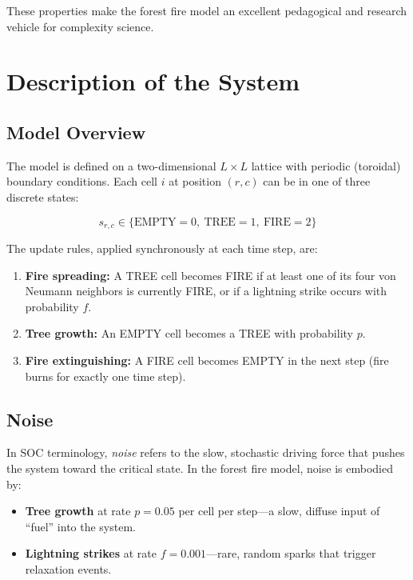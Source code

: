 \documentclass[12pt, a4paper]{article}
\begin{document}
These properties make the forest fire model an excellent pedagogical and research
vehicle for complexity science.

\section{Description of the System}
\label{sec:model}

\subsection{Model Overview}

The model is defined on a two-dimensional $L \times L$ lattice with periodic
(toroidal) boundary conditions. Each cell $i$ at position $(r,c)$ can be in one of
three discrete states:

\begin{equation}
    s_{r,c} \in \{\text{EMPTY}=0,\ \text{TREE}=1,\ \text{FIRE}=2\}
\end{equation}

The update rules, applied synchronously at each time step, are:

\begin{enumerate}
    \item \textbf{Fire spreading:} A TREE cell becomes FIRE if at least one of its
    four von Neumann neighbors is currently FIRE, or if a lightning strike occurs
    with probability $f$.
    \item \textbf{Tree growth:} An EMPTY cell becomes a TREE with probability $p$.
    \item \textbf{Fire extinguishing:} A FIRE cell becomes EMPTY in the next step
    (fire burns for exactly one time step).
\end{enumerate}

\subsection{Noise}

In SOC terminology, \emph{noise} refers to the slow, stochastic driving force that
pushes the system toward the critical state. In the forest fire model, noise is
embodied by:

\begin{itemize}
    \item \textbf{Tree growth} at rate $p = 0.05$ per cell per step—a slow,
    diffuse input of ``fuel'' into the system.
    \item \textbf{Lightning strikes} at rate $f = 0.001$—rare, random sparks that
    trigger relaxation events.
\end{itemize}
\end{document}
